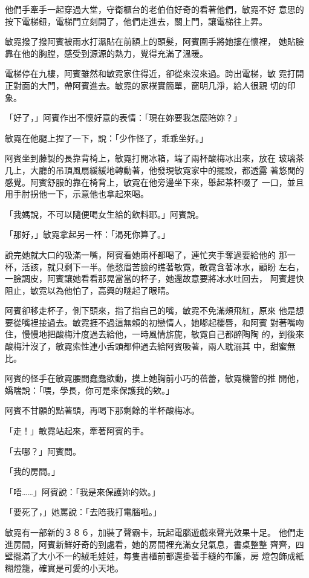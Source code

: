 他們手牽手一起穿過大堂，守衛櫃台的老伯伯好奇的看著他們，敏霓不好
意思的按下電梯鈕，電梯門立刻開了，他們走進去，關上門，讓電梯往上昇。

敏霓撥了撥阿賓被雨水打濕貼在前額上的頭髮，阿賓圍手將她摟在懷裡，
她貼臉靠在他的胸膛，感受到源源的熱力，覺得充滿了溫暖。

電梯停在九樓，阿賓雖然和敏霓家住得近，卻從來沒來過。跨出電梯，敏
霓打開正對面的大門，帶阿賓進去。敏霓的家樸實簡單，窗明几淨，給人很親
切的印象。

「好了，」阿賓作出不懷好意的表情：「現在妳要我怎麼陪妳？」

敏霓在他腿上捏了一下，說：「少作怪了，乖乖坐好。」

阿賓坐到藤製的長靠背椅上，敏霓打開冰箱，端了兩杯酸梅冰出來，放在
玻璃茶几上，大廳的吊頂風扇緩緩地轉動著，他發現敏霓家中的擺設，都透露
著悠閒的感覺。阿賓舒服的靠在椅背上，敏霓在他旁邊坐下來，舉起茶杯啜了
一口，並且用手肘拐他一下，示意他也拿起來喝。

「我媽說，不可以隨便喝女生給的飲料耶。」阿賓說。

「那好，」敏霓拿起另一杯：「渴死你算了。」

說完她就大口的吸滿一嘴，阿賓看她兩杯都喝了，連忙夾手奪過要給他的
那一杯，活該，就只剩下一半。他愁眉苦臉的瞧著敏霓，敏霓含著冰水，顧盼
左右，一臉調皮，阿賓讓她看看那晃當當的杯子，她還故意要將冰水吐回去，
阿賓趕快阻止，敏霓以為他怕了，高興的瞇起了眼睛。

阿賓卻移走杯子，側下頭來，指了指自己的嘴，敏霓不免滿頰飛紅，原來
他是想要從嘴裡接過去。敏霓捱不過這無賴的初戀情人，她嘟起櫻唇，和阿賓
對著嘴吻住，慢慢地把酸梅汁度過去給他，一時風情旂旎，敏霓自己都醉陶陶
的，到後來酸梅汁沒了，敏霓索性連小舌頭都伸過去給阿賓吸著，兩人耽溺其
中，甜蜜無比。

阿賓的怪手在敏霓腰間蠢蠢欲動，摸上她胸前小巧的蓓蕾，敏霓機警的推
開他，嬌喘說：「喂，學長，你可是來保護我的欸。」

阿賓不甘願的點著頭，再喝下那剩餘的半杯酸梅冰。

「走！」敏霓站起來，牽著阿賓的手。

「去哪？」阿賓問。

「我的房間。」

「唔……」阿賓說：「我是來保護妳的欸。」

「要死了，」她罵說：「去陪我打電腦啦。」

敏霓有一部新的３８６，加裝了聲霸卡，玩起電腦遊戲來聲光效果十足。
他們走進房間，阿賓新鮮好奇的到處看，她的房間裡充滿女兒氣息，書桌整整
齊齊，四壁擺滿了大小不一的絨毛娃娃，每隻書櫃前都還掛著手縫的布簾，房
燈包飾成紙糊燈籠，確實是可愛的小天地。

